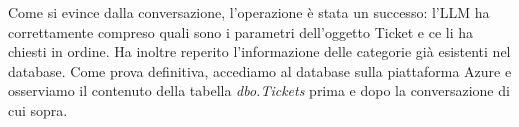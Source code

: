 Come si evince dalla conversazione, l'operazione è stata un successo: l'LLM ha correttamente compreso quali sono i parametri dell'oggetto Ticket e ce li ha chiesti in ordine.
Ha inoltre reperito l'informazione delle categorie già esistenti nel database. Come prova definitiva, accediamo al database sulla piattaforma Azure e osserviamo il contenuto
della tabella \textit{dbo.Tickets} prima e dopo la conversazione di cui sopra.


